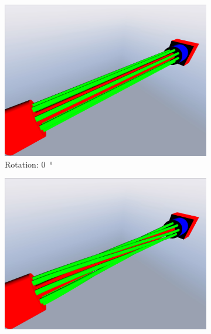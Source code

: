 \documentclass[review]{elsarticle}
\begin{document}


\begin{figure}[ht]
    \centering
    \begin{subfigure}[b]{0.475\textwidth}
        \centering
        \includegraphics[width=\textwidth]{benchmark_contact/NSC001deg000}
        \caption{{\small Rotation: \SI{0}{\degree}}}    
    \end{subfigure}
    \hfill
    \begin{subfigure}[b]{0.475\textwidth}  
        \centering 
        \includegraphics[width=\textwidth]{benchmark_contact/NSC001deg120}

\end{subfigure}
\end{figure}
\end{document}
